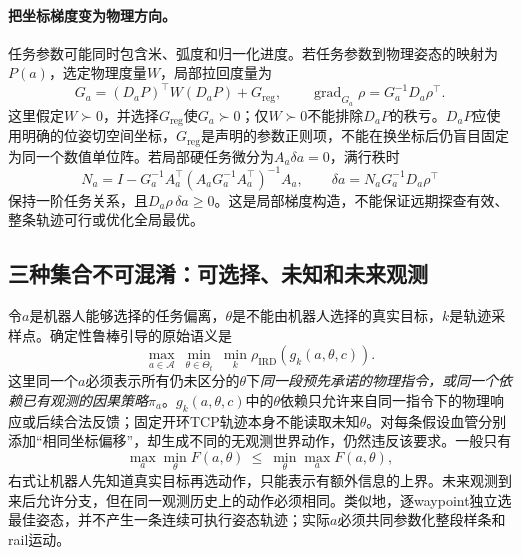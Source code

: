 \documentclass[11pt,a4paper]{article}
\numberwithin{equation}{section}
\theoremstyle{definition}
\begin{document}
\paragraph{把坐标梯度变为物理方向。}
任务参数可能同时包含米、弧度和归一化进度。若任务参数到物理姿态的映射为$P(a)$，选定物理度量$W$，局部拉回度量为
\begin{equation}
 G_a=(D_a P)^\top W(D_aP)+G_{\mathrm{reg}},
 \qquad \operatorname{grad}_{G_a}\rho=G_a^{-1}D_a\rho^\top.
 \label{ird:metricgradient}
\end{equation}
这里假定$W\succ0$，并选择$G_{\mathrm{reg}}$使$G_a\succ0$；仅$W\succ0$不能排除$D_aP$的秩亏。$D_aP$应使用明确的位姿切空间坐标，$G_{\mathrm{reg}}$是声明的参数正则项，不能在换坐标后仍盲目固定为同一个数值单位阵。若局部硬任务微分为$A_a\delta a=0$，满行秩时
\begin{equation}
 N_a=I-G_a^{-1}A_a^\top(A_aG_a^{-1}A_a^\top)^{-1}A_a,
 \qquad \delta a=N_aG_a^{-1}D_a\rho^\top
 \label{ird:nullgradient}
\end{equation}
保持一阶任务关系，且$D_a\rho\,\delta a\geq0$。这是局部梯度构造，不能保证远期探查有效、整条轨迹可行或优化全局最优。

\subsection{三种集合不可混淆：可选择、未知和未来观测}
令$a$是机器人能够选择的任务偏离，$\theta$是不能由机器人选择的真实目标，$k$是轨迹采样点。确定性鲁棒引导的原始语义是
\begin{equation}
 \max_{a\in\mathcal A}\ \min_{\theta\in\Theta_t}\ \min_k
 \rho_{\mathrm{IRD}}(g_k(a,\theta,c)).
 \label{ird:quantifiers}
\end{equation}
这里同一个$a$必须表示所有仍未区分的$\theta$下\emph{同一段预先承诺的物理指令，或同一个依赖已有观测的因果策略}$\pi_a$。$g_k(a,\theta,c)$中的$\theta$依赖只允许来自同一指令下的物理响应或后续合法反馈；固定开环TCP轨迹本身不能读取未知$\theta$。对每条假设血管分别添加“相同坐标偏移”，却生成不同的无观测世界动作，仍然违反该要求。一般只有
\begin{equation}
 \max_a\min_\theta F(a,\theta)
 \ \leq\ \min_\theta\max_a F(a,\theta),
 \label{ird:minimax}
\end{equation}
右式让机器人先知道真实目标再选动作，只能表示有额外信息的上界。未来观测到来后允许分支，但在同一观测历史上的动作必须相同。类似地，逐waypoint独立选最佳姿态，并不产生一条连续可执行姿态轨迹；实际$a$必须共同参数化整段样条和rail运动。
\end{document}
